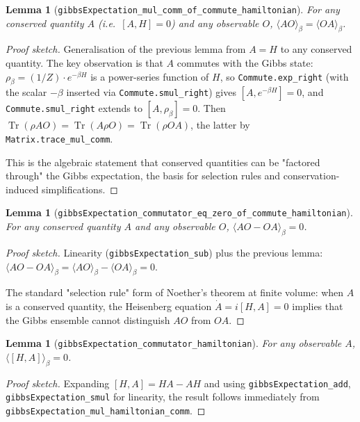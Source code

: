 \documentclass[a4paper,11pt]{article}
\newtheorem{lemma}[theorem]{Lemma}
\begin{document}
\begin{lemma}[\texttt{gibbsExpectation\_mul\_comm\_of\_commute\_hamiltonian}]
For any conserved quantity $A$ (i.e.\ $[A, H] = 0$) and any
observable $O$,
$\langle A O \rangle_\beta = \langle O A \rangle_\beta$.
\end{lemma}

\begin{proof}[Proof sketch]
Generalisation of the previous lemma from $A = H$ to any conserved
quantity.  The key observation is that $A$ commutes with the Gibbs
state: $\rho_\beta = (1/Z) \cdot e^{-\beta H}$ is a power-series
function of $H$, so
\texttt{Commute.exp\_right} (with the scalar
$-\beta$ inserted via \texttt{Commute.smul\_right}) gives
$[A, e^{-\beta H}] = 0$, and \texttt{Commute.smul\_right}
extends to $[A, \rho_\beta] = 0$.  Then
$\operatorname{Tr}(\rho A O) = \operatorname{Tr}(A \rho O) =
 \operatorname{Tr}(\rho O A)$,
the latter by \texttt{Matrix.trace\_mul\_comm}.

This is the algebraic statement that conserved quantities can be
"factored through" the Gibbs expectation, the basis for selection
rules and conservation-induced simplifications.
\end{proof}

\begin{lemma}[\texttt{gibbsExpectation\_commutator\_eq\_zero\_of\_commute\_hamiltonian}]
For any conserved quantity $A$ and any observable $O$,
$\langle A O - O A \rangle_\beta = 0$.
\end{lemma}

\begin{proof}[Proof sketch]
Linearity (\texttt{gibbsExpectation\_sub}) plus the previous lemma:
$\langle A O - O A \rangle_\beta = \langle A O \rangle_\beta - \langle O A \rangle_\beta = 0$.

The standard "selection rule" form of Noether's theorem at finite
volume: when $A$ is a conserved quantity, the Heisenberg equation
$\dot A = i[H, A] = 0$ implies that the Gibbs ensemble cannot
distinguish $A O$ from $O A$.
\end{proof}

\begin{lemma}[\texttt{gibbsExpectation\_commutator\_hamiltonian}]
For any observable $A$,
$\langle [H, A] \rangle_\beta = 0$.
\end{lemma}

\begin{proof}[Proof sketch]
Expanding $[H, A] = H A - A H$ and using
\texttt{gibbsExpectation\_add}, \texttt{gibbsExpectation\_smul} for
linearity, the result follows immediately from
\texttt{gibbsExpectation\_mul\_hamiltonian\_comm}.
\end{proof}
\end{document}
